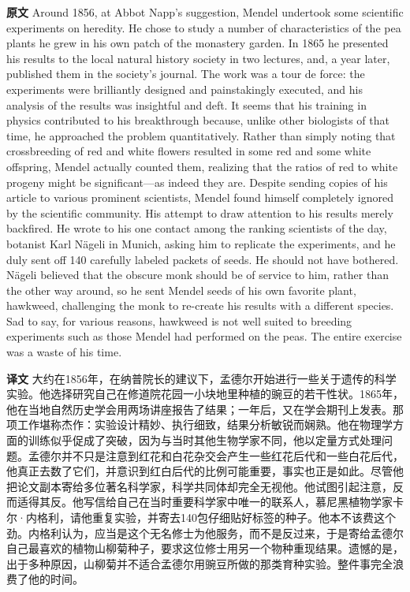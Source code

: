 \documentclass[UTF8,zihao=-4]{ctexart}
\newcommand{\BodyFont}{\fontsize{10.5pt}{15.5pt}\selectfont}
\renewenvironment{quote}{\par\noindent\begingroup\BodyFont}{\par\endgroup}
\begin{document}
\begin{quote}
\noindent\textbf{原文} Around 1856, at Abbot Napp's suggestion, Mendel undertook some scientific experiments on heredity. He chose to study a number of characteristics of the pea plants he grew in his own patch of the monastery garden. In 1865 he presented his results to the local natural history society in two lectures, and, a year later, published them in the society's journal. The work was a tour de force: the experiments were brilliantly designed and painstakingly executed, and his analysis of the results was insightful and deft. It seems that his training in physics contributed to his breakthrough because, unlike other biologists of that time, he approached the problem quantitatively. Rather than simply noting that crossbreeding of red and white flowers resulted in some red and some white offspring, Mendel actually counted them, realizing that the ratios of red to white progeny might be significant---as indeed they are. Despite sending copies of his article to various prominent scientists, Mendel found himself completely ignored by the scientific community. His attempt to draw attention to his results merely backfired. He wrote to his one contact among the ranking scientists of the day, botanist Karl Nägeli in Munich, asking him to replicate the experiments, and he duly sent off 140 carefully labeled packets of seeds. He should not have bothered. Nägeli believed that the obscure monk should be of service to him, rather than the other way around, so he sent Mendel seeds of his own favorite plant, hawkweed, challenging the monk to re-create his results with a different species. Sad to say, for various reasons, hawkweed is not well suited to breeding experiments such as those Mendel had performed on the peas. The entire exercise was a waste of his time.

\smallskip
\noindent\textbf{译文} 大约在1856年，在纳普院长的建议下，孟德尔开始进行一些关于遗传的科学实验。他选择研究自己在修道院花园一小块地里种植的豌豆的若干性状。1865年，他在当地自然历史学会用两场讲座报告了结果；一年后，又在学会期刊上发表。那项工作堪称杰作：实验设计精妙、执行细致，结果分析敏锐而娴熟。他在物理学方面的训练似乎促成了突破，因为与当时其他生物学家不同，他以定量方式处理问题。孟德尔并不只是注意到红花和白花杂交会产生一些红花后代和一些白花后代，他真正去数了它们，并意识到红白后代的比例可能重要，事实也正是如此。尽管他把论文副本寄给多位著名科学家，科学共同体却完全无视他。他试图引起注意，反而适得其反。他写信给自己在当时重要科学家中唯一的联系人，慕尼黑植物学家卡尔·内格利，请他重复实验，并寄去140包仔细贴好标签的种子。他本不该费这个劲。内格利认为，应当是这个无名修士为他服务，而不是反过来，于是寄给孟德尔自己最喜欢的植物山柳菊种子，要求这位修士用另一个物种重现结果。遗憾的是，出于多种原因，山柳菊并不适合孟德尔用豌豆所做的那类育种实验。整件事完全浪费了他的时间。
\end{quote}
\end{document}

